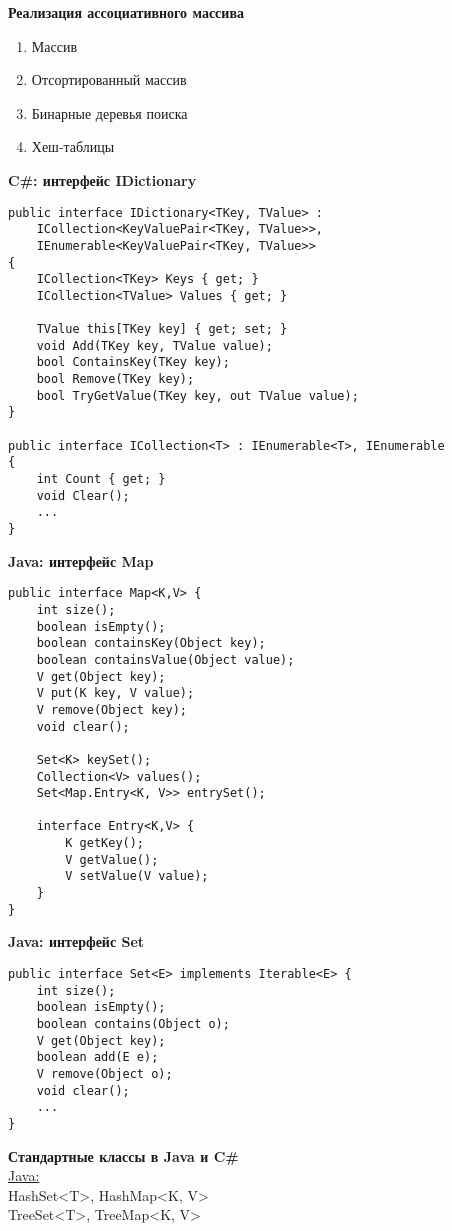 {\bf Реализация ассоциативного массива}
\begin{enumerate}
\item Массив
\item Отсортированный массив
\item Бинарные деревья поиска
\item Хеш-таблицы
\end{enumerate}
{\bf C\#: интерфейс IDictionary}
\begin{verbatim}
public interface IDictionary<TKey, TValue> :
    ICollection<KeyValuePair<TKey, TValue>>,
    IEnumerable<KeyValuePair<TKey, TValue>>
{
    ICollection<TKey> Keys { get; }
    ICollection<TValue> Values { get; }
    
    TValue this[TKey key] { get; set; }
    void Add(TKey key, TValue value);
    bool ContainsKey(TKey key);
    bool Remove(TKey key);
    bool TryGetValue(TKey key, out TValue value);
}

public interface ICollection<T> : IEnumerable<T>, IEnumerable
{
    int Count { get; }
    void Clear();
    ...
}
\end{verbatim}
{\bf Java: интерфейс Map}
\begin{verbatim}
public interface Map<K,V> {
    int size();
    boolean isEmpty();
    boolean containsKey(Object key);
    boolean containsValue(Object value);
    V get(Object key);
    V put(K key, V value);
    V remove(Object key);
    void clear();

    Set<K> keySet();
    Collection<V> values();
    Set<Map.Entry<K, V>> entrySet();
    
    interface Entry<K,V> {
        K getKey();
        V getValue();
        V setValue(V value);
    }
}
\end{verbatim}
{\bf Java: интерфейс Set}
\begin{verbatim}
public interface Set<E> implements Iterable<E> {
    int size();
    boolean isEmpty();
    boolean contains(Object o);
    V get(Object key);
    boolean add(E e);
    V remove(Object o);
    void clear();
    ...
}
\end{verbatim}
{\bf Стандартные классы в Java и C\#}\\
\underline{Java:} \\
HashSet<T>, HashMap<K, V> \\
TreeSet<T>, TreeMap<K, V>

